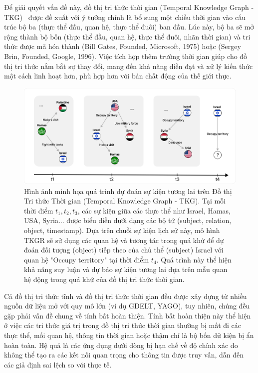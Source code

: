 Để giải quyết vấn đề này, đồ thị tri thức thời gian (Temporal Knowledge Graph - TKG)~\cite{ref_article02} được đề xuất với ý tưởng chính là bổ sung một chiều thời gian vào cấu trúc bộ ba (thực thể đầu, quan hệ, thực thể đuôi) ban đầu. Lúc này, bộ ba sẽ mở rộng thành bộ bốn (thực thể đầu, quan hệ, thực thể đuôi, nhãn thời gian) và tri thức được mã hóa thành (Bill Gates, Founded, Microsoft, 1975) hoặc (Sergey Brin, Founded, Google, 1996). Việc tích hợp thêm trường thời gian giúp cho đồ thị tri thức nắm bắt sự thay đổi, mang đến khả năng diễn đạt và xử lý kiến thức một cách linh hoạt hơn, phù hợp hơn với bản chất động của thế giới thực.

\begin{figure}[h!]
\centering
\includegraphics[width=15cm]{images/TKGexample1.png}
\caption{Hình ảnh minh họa quá trình dự đoán sự kiện tương lai trên Đồ thị Tri thức Thời gian (Temporal Knowledge Graph - TKG). Tại mỗi thời điểm $t_1, t_2, t_3$, các sự kiện giữa các thực thể như Israel, Hamas, USA, Syria... được biểu diễn dưới dạng các bộ tứ (subject, relation, object, timestamp). Dựa trên chuỗi sự kiện lịch sử này, mô hình TKGR sẽ sử dụng các quan hệ và tương tác trong quá khứ để dự đoán đối tượng (object) tiếp theo của chủ thể (subject) Israel với quan hệ "Occupy territory" tại thời điểm $t_4$. Quá trình này thể hiện khả năng suy luận và dự báo sự kiện tương lai dựa trên mẫu quan hệ động trong quá khứ của đồ thị tri thức thời gian.}
\label{fig:chatbots_classification}
\end{figure}

Cả đồ thị tri thức tĩnh và đồ thị tri thức thời gian đều được xây dựng từ nhiều nguồn dữ liệu mở với quy mô lớn (ví dụ GDELT, YAGO), tuy nhiên, chúng đều gặp phải vấn đề chung về tính bất hoàn thiện. Tính bất hoàn thiện này thể hiện ở việc các tri thức giá trị trong đồ thị tri thức thời gian thường bị mất đi các thực thể, mối quan hệ, thông tin thời gian hoặc thậm chí là bộ bốn dữ kiện bị ẩn hoàn toàn. Hệ quả là các ứng dụng dưới dòng bị hạn chế về độ chính xác do không thể tạo ra các kết nối quan trọng cho thông tin được truy vấn, dẫn đến các giả định sai lệch so với thực tế.

